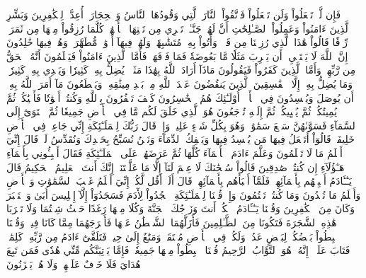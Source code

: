 فَإِن لَّمۡ تَفۡعَلُواْ وَلَن تَفۡعَلُواْ فَٱتَّقُواْ ٱلنَّارَ ٱلَّتِي وَقُودُهَا ٱلنَّاسُ وَٱلۡحِجَارَةُۖ أُعِدَّتۡ لِلۡكَٰفِرِينَ
وَبَشِّرِ ٱلَّذِينَ ءَامَنُواْ وَعَمِلُواْ ٱلصَّـٰلِحَٰتِ أَنَّ لَهُمۡ جَنَّـٰتٖ تَجۡرِي مِن تَحۡتِهَا ٱلۡأَنۡهَٰرُۖ كُلَّمَا رُزِقُواْ مِنۡهَا مِن ثَمَرَةٖ رِّزۡقٗا قَالُواْ هَٰذَا ٱلَّذِي رُزِقۡنَا مِن قَبۡلُۖ وَأُتُواْ بِهِۦ مُتَشَٰبِهٗاۖ وَلَهُمۡ فِيهَآ أَزۡوَٰجٞ مُّطَهَّرَةٞۖ وَهُمۡ فِيهَا خَٰلِدُونَ
۞إِنَّ ٱللَّهَ لَا يَسۡتَحۡيِۦٓ أَن يَضۡرِبَ مَثَلٗا مَّا بَعُوضَةٗ فَمَا فَوۡقَهَاۚ فَأَمَّا ٱلَّذِينَ ءَامَنُواْ فَيَعۡلَمُونَ أَنَّهُ ٱلۡحَقُّ مِن رَّبِّهِمۡۖ وَأَمَّا ٱلَّذِينَ كَفَرُواْ فَيَقُولُونَ مَاذَآ أَرَادَ ٱللَّهُ بِهَٰذَا مَثَلٗاۘ يُضِلُّ بِهِۦ كَثِيرٗا وَيَهۡدِي بِهِۦ كَثِيرٗاۚ وَمَا يُضِلُّ بِهِۦٓ إِلَّا ٱلۡفَٰسِقِينَ
ٱلَّذِينَ يَنقُضُونَ عَهۡدَ ٱللَّهِ مِنۢ بَعۡدِ مِيثَٰقِهِۦ وَيَقۡطَعُونَ مَآ أَمَرَ ٱللَّهُ بِهِۦٓ أَن يُوصَلَ وَيُفۡسِدُونَ فِي ٱلۡأَرۡضِۚ أُوْلَـٰٓئِكَ هُمُ ٱلۡخَٰسِرُونَ
كَيۡفَ تَكۡفُرُونَ بِٱللَّهِ وَكُنتُمۡ أَمۡوَٰتٗا فَأَحۡيَٰكُمۡۖ ثُمَّ يُمِيتُكُمۡ ثُمَّ يُحۡيِيكُمۡ ثُمَّ إِلَيۡهِ تُرۡجَعُونَ
هُوَ ٱلَّذِي خَلَقَ لَكُم مَّا فِي ٱلۡأَرۡضِ جَمِيعٗا ثُمَّ ٱسۡتَوَىٰٓ إِلَى ٱلسَّمَآءِ فَسَوَّىٰهُنَّ سَبۡعَ سَمَٰوَٰتٖۚ وَهُوَ بِكُلِّ شَيۡءٍ عَلِيمٞ
وَإِذۡ قَالَ رَبُّكَ لِلۡمَلَـٰٓئِكَةِ إِنِّي جَاعِلٞ فِي ٱلۡأَرۡضِ خَلِيفَةٗۖ قَالُوٓاْ أَتَجۡعَلُ فِيهَا مَن يُفۡسِدُ فِيهَا وَيَسۡفِكُ ٱلدِّمَآءَ وَنَحۡنُ نُسَبِّحُ بِحَمۡدِكَ وَنُقَدِّسُ لَكَۖ قَالَ إِنِّيٓ أَعۡلَمُ مَا لَا تَعۡلَمُونَ
وَعَلَّمَ ءَادَمَ ٱلۡأَسۡمَآءَ كُلَّهَا ثُمَّ عَرَضَهُمۡ عَلَى ٱلۡمَلَـٰٓئِكَةِ فَقَالَ أَنۢبِـُٔونِي بِأَسۡمَآءِ هَـٰٓؤُلَآءِ إِن كُنتُمۡ صَٰدِقِينَ
قَالُواْ سُبۡحَٰنَكَ لَا عِلۡمَ لَنَآ إِلَّا مَا عَلَّمۡتَنَآۖ إِنَّكَ أَنتَ ٱلۡعَلِيمُ ٱلۡحَكِيمُ
قَالَ يَـٰٓـَٔادَمُ أَنۢبِئۡهُم بِأَسۡمَآئِهِمۡۖ فَلَمَّآ أَنۢبَأَهُم بِأَسۡمَآئِهِمۡ قَالَ أَلَمۡ أَقُل لَّكُمۡ إِنِّيٓ أَعۡلَمُ غَيۡبَ ٱلسَّمَٰوَٰتِ وَٱلۡأَرۡضِ وَأَعۡلَمُ مَا تُبۡدُونَ وَمَا كُنتُمۡ تَكۡتُمُونَ
وَإِذۡ قُلۡنَا لِلۡمَلَـٰٓئِكَةِ ٱسۡجُدُواْ لِأٓدَمَ فَسَجَدُوٓاْ إِلَّآ إِبۡلِيسَ أَبَىٰ وَٱسۡتَكۡبَرَ وَكَانَ مِنَ ٱلۡكَٰفِرِينَ
وَقُلۡنَا يَـٰٓـَٔادَمُ ٱسۡكُنۡ أَنتَ وَزَوۡجُكَ ٱلۡجَنَّةَ وَكُلَا مِنۡهَا رَغَدًا حَيۡثُ شِئۡتُمَا وَلَا تَقۡرَبَا هَٰذِهِ ٱلشَّجَرَةَ فَتَكُونَا مِنَ ٱلظَّـٰلِمِينَ
فَأَزَلَّهُمَا ٱلشَّيۡطَٰنُ عَنۡهَا فَأَخۡرَجَهُمَا مِمَّا كَانَا فِيهِۖ وَقُلۡنَا ٱهۡبِطُواْ بَعۡضُكُمۡ لِبَعۡضٍ عَدُوّٞۖ وَلَكُمۡ فِي ٱلۡأَرۡضِ مُسۡتَقَرّٞ وَمَتَٰعٌ إِلَىٰ حِينٖ
فَتَلَقَّىٰٓ ءَادَمُ مِن رَّبِّهِۦ كَلِمَٰتٖ فَتَابَ عَلَيۡهِۚ إِنَّهُۥ هُوَ ٱلتَّوَّابُ ٱلرَّحِيمُ
قُلۡنَا ٱهۡبِطُواْ مِنۡهَا جَمِيعٗاۖ فَإِمَّا يَأۡتِيَنَّكُم مِّنِّي هُدٗى فَمَن تَبِعَ هُدَايَ فَلَا خَوۡفٌ عَلَيۡهِمۡ وَلَا هُمۡ يَحۡزَنُونَ
